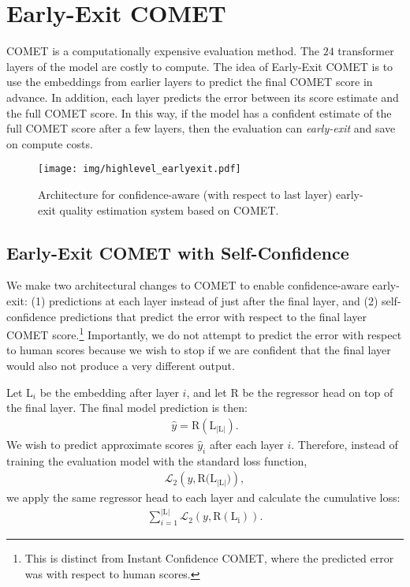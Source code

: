 \section{Early-Exit COMET}
\label{sec:goal_earlyexit1}

COMET is a computationally expensive evaluation method. The $24$ transformer layers of the model are costly to compute. The idea of Early-Exit COMET is to use the embeddings from earlier layers to predict the final COMET score in advance. In addition, each layer predicts the error between its score estimate and the full COMET score. In this way, if the model has a confident estimate of the full COMET score after a few layers, then the evaluation can \emph{early-exit} and save on compute costs.


\begin{figure}[t]
    \centering
    \texttt{[image: img/highlevel\_earlyexit.pdf]}
    \caption{Architecture for confidence-aware (with respect to last layer) early-exit quality estimation system based on COMET.}
    \label{fig:highlevel_earlyexit}
\end{figure}


\subsection{Early-Exit COMET with Self-Confidence}
\label{sec:earlyexit_model}

We make two architectural changes to COMET to enable confidence-aware early-exit:
(1) predictions at each layer instead of just after the final layer, and
(2) self-confidence predictions that predict the error with respect to the final layer COMET score.\footnote{This is distinct from Instant Confidence COMET, where the predicted error was with respect to human scores.}
Importantly, we do not attempt to predict the error with respect to human scores because we wish to stop if we are confident that the final layer would also not produce a very different output.

Let $\mathrm{L}_i$ be the embedding after layer $i$, and let $\mathrm{R}$ be the regressor head on top of the final layer.
The final model prediction is then:
\begin{align}
\hat{y} = \mathrm{R}(\mathrm{L}_{|\mathrm{L}|}).
\end{align}
We wish to predict approximate scores $\hat{y}_i$ after each layer $i$.
Therefore, instead of training the evaluation model with the standard loss function,
\begin{gather}
\mathcal{L}_2 \left(y, \mathrm{R}(\mathrm{L_\mathrm{|L|})} \right),
\end{gather}
we apply the same regressor head to each layer and calculate the cumulative loss:
\begin{align}
\sum_{i=1}^{|\mathrm{L}|} \mathcal{L}_2 \left(y, \mathrm{R}(\mathrm{L_i}) \right).
\end{align}

